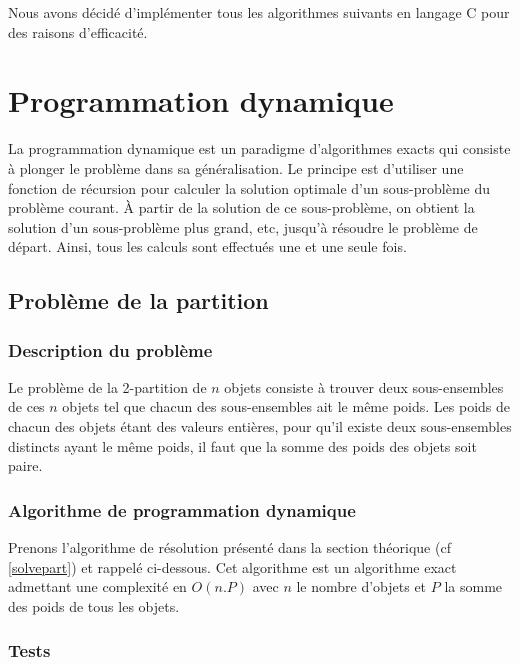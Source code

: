 

Nous avons décidé d'implémenter tous les algorithmes suivants en langage C pour des raisons d'efficacité.

\section{Programmation dynamique}
La programmation dynamique est un paradigme d'algorithmes exacts qui consiste à plonger le problème dans sa généralisation. Le principe est d'utiliser une fonction de récursion pour calculer la solution optimale d'un sous-problème du problème courant. À partir de la solution de ce sous-problème, on obtient la solution d'un sous-problème plus grand, etc, jusqu'à résoudre le problème de départ. Ainsi, tous les calculs sont effectués une et une seule fois.


\subsection{Problème de la partition}

\subsubsection{Description du problème}
Le problème de la 2-partition de $n$ objets consiste à trouver deux sous-ensembles de ces $n$ objets tel que chacun des sous-ensembles ait le même poids. Les poids de chacun des objets étant des valeurs entières, pour qu’il existe deux sous-ensembles distincts ayant le même poids, il faut que la somme des poids des objets soit paire.

\subsubsection{Algorithme de programmation dynamique}
Prenons l'algorithme de résolution présenté dans la section théorique (cf \ref{solvepart}) et rappelé ci-dessous. Cet algorithme est un algorithme exact admettant une complexité en $O(n.P)$ avec $n$ le nombre d'objets et $P$ la somme des poids de tous les objets.


\subsubsection{Tests}

